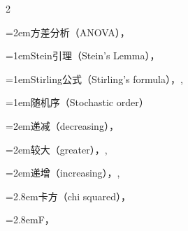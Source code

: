 \begin{multicols}{2}
\par\noindent\hangindent=2em\hspace*{1em}\label{idx:983}方差分析（ANOVA），\hyperref[sec:11.5.6]{\pageref*{sec:11.5.6}}\par
\par\addvspace{2pt}
\par\noindent\hangindent=1em\hspace*{0em}\label{idx:984}Stein引理（Stein’s Lemma），\hyperref[lem:3.6.5]{\pageref*{lem:3.6.5}}\par
\par\addvspace{2pt}
\par\noindent\hangindent=1em\hspace*{0em}\label{idx:985}Stirling公式（Stirling’s formula），\hyperref[exercise:1.28]{\pageref*{exercise:1.28}}, \hyperref[exercise:5.35]{\pageref*{exercise:5.35}}\par
\par\addvspace{2pt}
\par\noindent\hangindent=1em\hspace*{0em}\label{idx:986}随机序（Stochastic order）\par
\par\noindent\hangindent=2em\hspace*{1em}\label{idx:987}递减（decreasing），\hyperref[exercise:3.43]{\pageref*{exercise:3.43}}\par
\par\noindent\hangindent=2em\hspace*{1em}\label{idx:988}较大（greater），\hyperref[exercise:1.49]{\pageref*{exercise:1.49}}, \hyperref[exercise:2.10]{\pageref*{exercise:2.10}}\par
\par\noindent\hangindent=2em\hspace*{1em}\label{idx:989}递增（increasing），\hyperref[exercise:3.41]{\pageref*{exercise:3.41}}, \hyperref[idxocc:989:380]{\pageref*{idxocc:989:380}}\par
\par\noindent\hangindent=2.8em\hspace*{1.8em}\label{idx:990}卡方（chi squared），\hyperref[exercise:5.19]{\pageref*{exercise:5.19}}\par
\par\noindent\hangindent=2.8em\hspace*{1.8em}\label{idx:991}F，\hyperref[exercise:5.19]{\pageref*{exercise:5.19}}\par

\end{multicols}

